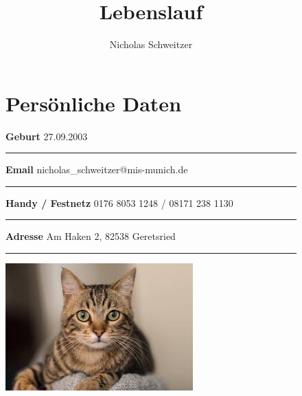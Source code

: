 \documentclass[12pt]{article}
\title{\vspace{-96pt}\Huge Lebenslauf}
\author{\Huge Nicholas Schweitzer}
\date{}
\newcommand{\sect}[1]{
  {
    \vspace{12pt}
    \section*{
      \fontsize{18}{0}\selectfont
      \hspace{-12pt}
      \vspace{-12pt}
      #1
    }
    \vspace{-6pt}
  }
}
\newcommand{\sep}{{\color{gray}\vspace{-12pt}\hrule}}
\begin{document}
\maketitle
\vspace{-32pt}


\begin{figure}[htb!]
  \begin{minipage}{0.7\textwidth}
    \sect{Pers{\"o}nliche Daten}
    \vspace{7pt}

    \textbf{Geburt} \hfill{27.09.2003} \, \\
    \sep
    \vspace{7pt}
    \textbf{Email} \hfill{nicholas\_schweitzer@mis-munich.de} \, \\
    \sep
    \vspace{7pt}
    \textbf{Handy / Festnetz} \hfill{0176 8053 1248 / 08171 238 1130} \, \\
    \sep
    \vspace{7pt}
    \textbf{Adresse} \hfill{Am Haken 2, 82538 Geretsried \, }\\
    \sep
    \vspace{7pt}
  \end{minipage}
  \begin{minipage}{0.2\textwidth}
    \includegraphics[trim=-20 60 0 0mm, scale=0.5]{cat.jpg}
  \end{minipage}
\end{figure}
\vspace{-30pt}
\end{document}
